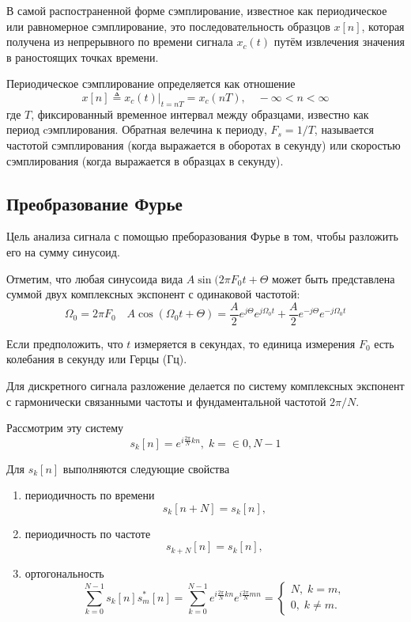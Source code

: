 \documentclass[oneside, final, 12pt]{extarticle}
\begin{document}
  В самой распостраненной форме сэмплирование, известное как периодическое
  или равномерное сэмплирование, это последовательность образцов
  $x[n]$, которая получена из непрерывного по времени сигнала
  $x_c(t)$ путём извлечения значения в раностоящих точках времени.

  Периодическое сэмплирование определяется как отношение
  \[
    x[n] \triangleq x_c(t) \left. \right|_{t=nT} = x_c(nT), \quad
    - \infty < n < \infty
  \]
  где $T$, фиксированный временное интервал между образцами, известно
  как период cэмплирования. Обратная велечина к периоду, $F_s = 1 / T$,
  называется частотой сэмплирования (когда выражается в оборотах в секунду)
  или скоростью сэмплирования (когда выражается в образцах в секунду).

\subsection{Преобразование Фурье}
  Цель анализа сигнала с помощью преборазования Фурье
  в том, чтобы разложить его на сумму синусоид.

  Отметим, что любая синусоида вида $A \sin (2 \pi F_0 t + \Theta$
  может быть представлена суммой двух комплексных экспонент с одинаковой
  частотой:
  \[
    \Omega_0 = 2 \pi F_0 \quad
    A \cos(\Omega_0 t + \Theta) =
    \frac{A}{2} e^{j\Theta} e^{j\Omega_0 t} +
    \frac{A}{2} e^{-j\Theta} e^{-j\Omega_0 t}
  \]

  Если предположить, что $t$ измеряется в секундах, то единица измерения
  $F_0$ есть колебания в секунду или Герцы (Гц).

  Для дискретного сигнала разложение делается по систему
  комплексных экспонент с гармонически связанными частоты и
  фундаментальной частотой $2 \pi / N$.

  Рассмотрим эту систему
  \[
    s_k[n]=e^{i\tfrac{2\pi}{N}kn}, \; k=\in{0,N-1}
  \]

  Для $s_k[n]$ выполняются следующие свойства

  \begin{enumerate}
  \item периодичность по времени \[
    s_k[n + N] = s_k[n],
  \]
  \item периодичность по частоте
  \[
    s_{k+N}[n] = s_k[n],
  \]
  \item ортогональность
  \[
    \sum_{k=0}^{N-1} s_k[n]s_m^*[n] =
    \sum_{k=0}^{N-1} e^{i\tfrac{2\pi}{N}kn} e^{i\tfrac{2\pi}{N}mn} =
    \left\{ \begin{aligned}
        N, \; k = m ,\\
        0, \; k \not= m.
      \end{aligned}
    \right.
  \]
  \end{enumerate}
\end{document}
